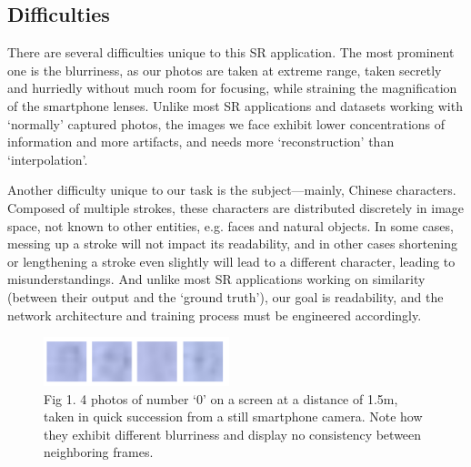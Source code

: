\subsection{Difficulties}
There are several difficulties unique to this SR application. The most prominent one is the blurriness, as our photos are taken at extreme range, taken secretly and hurriedly without much room for focusing, while straining the magnification of the smartphone lenses. Unlike most SR applications and datasets working with ‘normally’ captured photos, the images we face exhibit lower concentrations of information and more artifacts, and needs more ‘reconstruction’ than ‘interpolation’.

Another difficulty unique to our task is the subject—mainly, Chinese characters. Composed of multiple strokes, these characters are distributed discretely in image space, not known to other entities, e.g. faces and natural objects. In some cases, messing up a stroke will not impact its readability, and in other cases shortening or lengthening a stroke even slightly will lead to a different character, leading to misunderstandings. And unlike most SR applications working on similarity (between their output and the ‘ground truth’), our goal is readability, and the network architecture and training process must be engineered accordingly.
 
\begin{figure}
	\centering
	\includegraphics[width=0.48\textwidth]{pic/zeros}
    \caption{ Fig 1. 4 photos of number ‘0’ on a screen at a distance of 1.5m, taken in quick succession from a still smartphone camera. Note how they exhibit different blurriness and display no consistency between neighboring frames.}
	\label{fig-zeros}
\end{figure}


